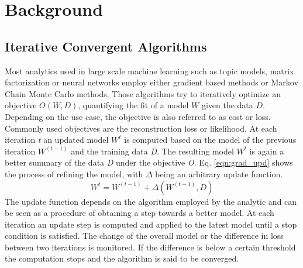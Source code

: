 \chapter{Background}
\label{c:background}

\section{Iterative Convergent Algorithms}
Most analytics used in large scale machine learning such as topic models, matrix factorization or neural networks employ either gradient based methods or Markov Chain Monte Carlo methods. Those algorithms try to iteratively optimize an objective \textit{$O(W, D)$}, quantifying the fit of a model \textit{$W$} given the data \textit{$D$}. Depending on the use case, the objective is also referred to as cost or loss. Commonly used objectives are the reconstruction loss or likelihood. At each iteration \textit{t} an updated model \textit{$W^{t}$} is computed based on the model of the previous iteration \textit{$W^{(t-1)}$} and the training data \textit{D}. The resulting model \textit{$W^{t}$} is again a better summary of the data \textit{D} under the objective \textit{O}. Eq. \ref{eqn:grad_upd} shows the process of refining the model, with $\Delta$ being an arbitrary update function.
\begin{equation}
W^{t} = W^{(t-1)} + \Delta(W^{(t-1)}, D)
\label{eqn:grad_upd}
\end{equation}
The update function depends on the algorithm employed by the analytic and can be seen as a procedure of obtaining a step towards a better model. At each iteration an update step is computed and applied to the latest model until a stop condition is satisfied. The change of the overall model or the difference in loss between two iterations is monitored. If the difference is below a certain threshold the computation stops and the algorithm is said to be converged.


